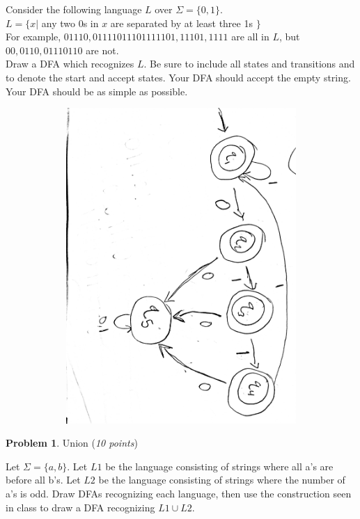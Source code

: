 \documentclass[11pt]{article}
\theoremstyle{definition}
\theoremstyle{theorem}
\newtheorem{prob}{Problem}
\newcommand{\solution}{\medskip\noindent{\color{blue}\textbf{Solution:}}}
\begin{document}
Consider the following language $L$ over $\Sigma = \{0, 1\}$. \\

$L = \{x | $ any two 0s in $x$ are separated by at least three 1s $\}$\\

For example, $01110, 01111011101111101, 11101, 1111$ are all in $L$, but $00, 0110, 01110110$ are not.\\

Draw a DFA which recognizes $L$. Be sure to include all states and transitions and to denote the start and accept states. Your DFA should accept the empty string. Your DFA should be as simple as possible.

\solution


\includegraphics[angle=90,origin=c, width=15cm, height=12cm]{./images/prob41.jpg}






\newpage

\begin{prob} Union (\emph{10 points})\end{prob}

Let $\Sigma = \{a,b\}$. Let $L1$ be the language consisting of strings where all a's are before all b's. Let $L2$ be the language consisting of strings where the number of a's is odd. Draw DFAs recognizing each language, then use the construction seen in class to draw a DFA recognizing $L1 \cup L2$.
\end{document}
